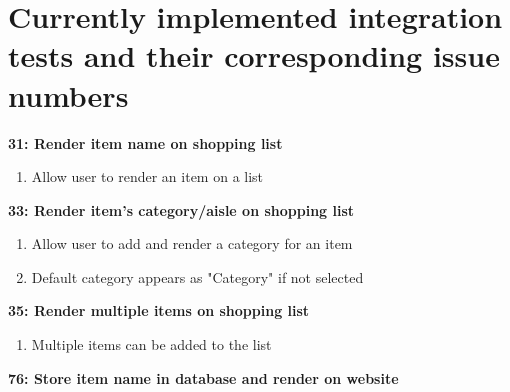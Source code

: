 \documentclass[10pt,onecolumn]{witseiepaper}
\begin{document}
\vspace{5mm}
\section*{Currently implemented integration tests and their corresponding issue numbers}




\textbf{31: Render item name on shopping list}

\begin{enumerate}
	\item Allow user to render an item on a list
\end{enumerate}

\textbf{33: Render item's category/aisle on shopping list}

\begin{enumerate}
	\item Allow user to add and render a category for an item
	\item Default category appears as "Category" if not selected
\end{enumerate}

\textbf{35: Render multiple items on shopping list}

\begin{enumerate}
	\item Multiple items can be added to the list
\end{enumerate}

\textbf{76: Store item name in database and render on website}
\end{document}
